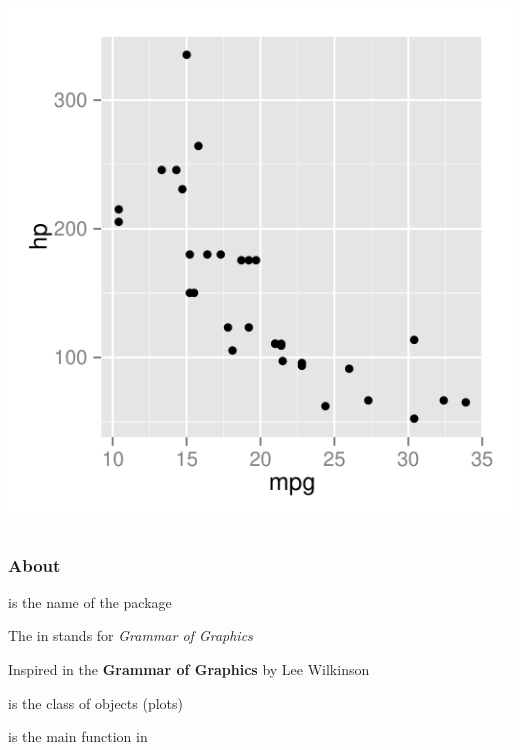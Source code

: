 \documentclass[12pt]{beamer}\usepackage[]{graphicx}\usepackage[]{color}
\newenvironment{knitrout}{}{} %
\begin{document}
\begin{frame}[fragile]
\begin{columns}[t]
\begin{column}{0.5\textwidth}
\begin{knitrout}
{\centering \includegraphics[width=.85\linewidth,height=.8\linewidth]{figure/unnamed-chunk-4-1} 

}



\end{knitrout}
\end{column}
\end{columns}

\end{frame}


\begin{frame}[fragile]
\frametitle{About }

\bbi
  \item {} is the name of the package
  \item The  in  stands for \textit{Grammar of Graphics}
  \item Inspired in the \textbf{Grammar of Graphics} by Lee Wilkinson
  \item {} is the class of objects (plots)
  \item {} is the main function in 
\ei

\end{frame}


\begin{frame}
\begin{center}
\Huge{}
\end{center}
\end{frame}
\end{document}
